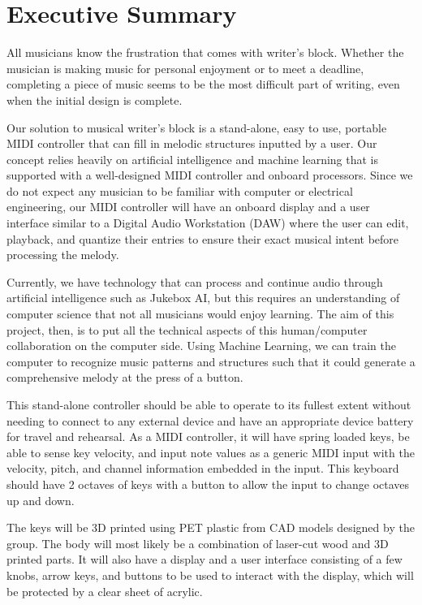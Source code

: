 \section{Executive Summary}

All musicians know the frustration that comes with writer’s block. Whether the musician
is making music for personal enjoyment or to meet a deadline, completing a piece of music
seems to be the most difficult part of writing, even when the initial design is complete.

Our solution to musical writer’s block is a stand-alone, easy to use, portable MIDI
controller that can fill in melodic structures inputted by a user. Our concept relies heavily on
artificial intelligence and machine learning that is supported with a well-designed MIDI
controller and onboard processors. Since we do not expect any musician to be familiar with
computer or electrical engineering, our MIDI controller will have an onboard display and a user
interface similar to a Digital Audio Workstation (DAW) where the user can edit, playback, and
quantize their entries to ensure their exact musical intent before processing the melody.

Currently, we have technology that can process and continue audio through artificial
intelligence such as Jukebox AI, but this requires an understanding of computer science
that not all musicians would enjoy learning. The aim of this project, then, is to put all the
technical aspects of this human/computer collaboration on the computer side. Using Machine
Learning, we can train the computer to recognize music patterns and structures such that it
could generate a comprehensive melody at the press of a button.

This stand-alone controller should be able to operate to its fullest extent without
needing to connect to any external device and have an appropriate device battery for travel
and rehearsal. As a MIDI controller, it will have spring loaded keys, be able to sense key
velocity, and input note values as a generic MIDI input with the velocity, pitch, and channel
information embedded in the input. This keyboard should have 2 octaves of keys with a button
to allow the input to change octaves up and down.

The keys will be 3D printed using PET plastic from CAD models designed by the group.
The body will most likely be a combination of laser-cut wood and 3D printed parts. It will also
have a display and a user interface consisting of a few knobs, arrow keys, and buttons to be
used to interact with the display, which will be protected by a clear sheet of acrylic.

